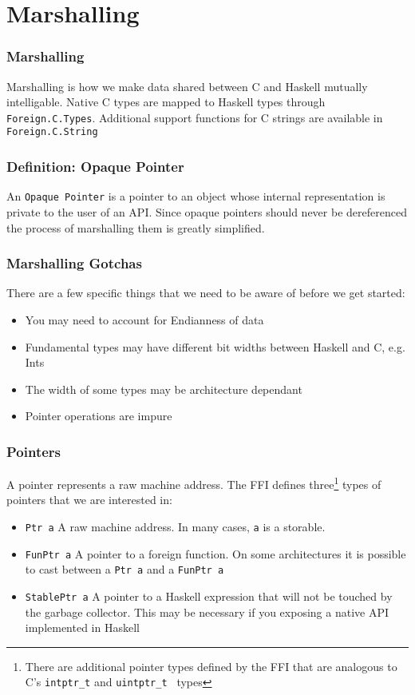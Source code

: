 \documentclass{beamer}
\begin{document}
\section{Marshalling}
\begin{frame}
    \frametitle{Marshalling}
    Marshalling is how we make data shared between C and Haskell mutually
    intelligable.  Native C types are mapped to Haskell types through
    {\tt Foreign.C.Types}.  Additional support functions for C strings are
    available in {\tt Foreign.C.String}
\end{frame}
\begin{frame}
    \frametitle{Definition: Opaque Pointer}
    An {\tt Opaque Pointer} is a pointer to an object whose internal
    representation is private to the user of an API.  Since opaque pointers
    should never be dereferenced the process of marshalling them is greatly
    simplified.
\end{frame}
\begin{frame}
    \frametitle{Marshalling Gotchas}
    There are a few specific things that we need to be aware of before we get
    started:
    \begin{itemize}
        \item{You may need to account for Endianness of data}
        \item{Fundamental types may have different bit widths between Haskell
            and C, e.g. Ints}
        \item{The width of some types may be architecture dependant}
        \item{Pointer operations are impure}
    \end{itemize}
\end{frame}
\begin{frame}
    \frametitle{Pointers}
    A pointer represents a raw machine address.  The FFI defines
    three\footnote{There are additional pointer types defined by
        the FFI that are analogous to C's {\tt intptr\_t} and {\tt uintptr\_t
    } types} types of
    pointers that we are interested in:
    \begin{itemize}
        \item{{\tt Ptr a} A raw machine address.  In many cases, {\tt a} is a
            storable.}
        \item{{\tt FunPtr a} A pointer to a foreign function.  On some
                architectures it is possible to cast between a {\tt Ptr a} and
            a {\tt FunPtr a}}
        \item{{\tt StablePtr a} A pointer to a Haskell expression that will not
                be touched by the garbage collector.  This may be necessary if
            you exposing a native API implemented in Haskell}
    \end{itemize}
\end{frame}
\end{document}

